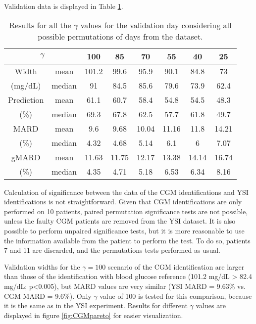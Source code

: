 Validation data is displayed in Table \ref{tab:resultsCGMval}.

\begin{table}[hbtp]
	\centering
	\begin{tabular}{| c | c | c | c | c | c | c | c |} 
	\hline
	\multicolumn{2}{|c|}{$\gamma$} & 100 & 85 & 70 & 55 & 40 & 25 \\											
	\hline
	Width & mean &	101.2 & 99.6 & 95.9 & 90.1 & 84.8 & 73 \\
	(mg/dL) & median & 91 & 84.5 & 85.6 & 79.6 & 73.9 & 62.4 \\
	\hline
	Prediction & mean & 61.1 & 60.7 & 58.4 & 54.8 & 54.5 & 48.3 \\
	(\%) & median & 69.3 & 67.8 & 62.5 & 57.7 & 61.8 & 49.7 \\
	\hline
	MARD & mean & 9.6 & 9.68 & 10.04 & 11.16 & 11.8 & 14.21 \\
	(\%) & median & 4.32 & 4.68 & 5.14 & 6.1 & 6 & 7.07 \\
	\hline
	gMARD & mean & 11.63 & 11.75 & 12.17 & 13.38 & 14.14 & 16.74 \\
	(\%) & median & 4.35 & 4.71 & 5.18 & 6.53 & 6.34 & 8.16 \\
	\hline
\end{tabular}
\caption{Results for all the $\gamma$ values for the validation day considering all possible permutations of days from the dataset.}
\label{tab:resultsCGMval}
\end{table}

Calculation of significance between the data of the CGM identifications and YSI identifications is not straightforward. Given that CGM identifications are only performed on 10 patients, paired permutation significance tests are not possible, unless the faulty CGM patients are removed from the YSI dataset. It is also possible to perform unpaired significance tests, but it is more reasonable to use the information available from the patient to perform the test. To do so, patients 7 and 11 are discarded, and the permutations tests performed as usual.

Validation widths for the $\gamma=100$ scenario of the CGM identification are larger than those of the identification with blood glucose reference (101.2 mg/dL > 82.4 mg/dL; p<0.005), but MARD values are very similar (YSI MARD = 9.63\% vs. CGM MARD = 9.6\%). Only $\gamma$ value of 100 is tested for this comparison, because it is the same as in the YSI experiment. Results for different $\gamma$ values are displayed in figure \ref{fig:CGMpareto} for easier visualization.

